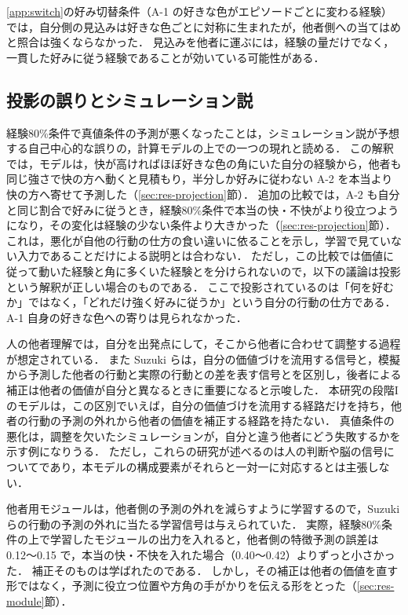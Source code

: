\ref{app:switch}の好み切替条件（A-1 の好きな色がエピソードごとに変わる経験）では，自分側の見込みは好きな色ごとに対称に生まれたが，他者側への当てはめと照合は強くならなかった．
見込みを他者に運ぶには，経験の量だけでなく，一貫した好みに従う経験であることが効いている可能性がある．

\subsection{投影の誤りとシミュレーション説}\label{sec:disc-projection}
経験80\%条件で真値条件の予測が悪くなったことは，シミュレーション説が予想する自己中心的な誤り\cite{goldman2006simulating}の，計算モデルの上での一つの現れと読める．
この解釈では，モデルは，快が高ければほぼ好きな色の角にいた自分の経験から，他者も同じ強さで快の方へ動くと見積もり，半分しか好みに従わない A-2 を本当より快の方へ寄せて予測した（\ref{sec:res-projection}節）．
追加の比較では，A-2 も自分と同じ割合で好みに従うとき，経験80\%条件で本当の快・不快がより役立つようになり，その変化は経験の少ない条件より大きかった（\ref{sec:res-projection}節）．
これは，悪化が自他の行動の仕方の食い違いに依ることを示し，学習で見ていない入力であることだけによる説明とは合わない．
ただし，この比較では価値に従って動いた経験と角に多くいた経験とを分けられないので，以下の議論は投影という解釈が正しい場合のものである．
ここで投影されているのは「何を好むか」ではなく，「どれだけ強く好みに従うか」という自分の行動の仕方である．
A-1 自身の好きな色への寄りは見られなかった．

人の他者理解では，自分を出発点にして，そこから他者に合わせて調整する過程が想定されている\cite{epley2004perspective,tamir2010neural}．
また Suzuki ら\cite{suzuki2012learning}は，自分の価値づけを流用する信号と，模擬から予測した他者の行動と実際の行動との差を表す信号とを区別し，後者による補正は他者の価値が自分と異なるときに重要になると示唆した．
本研究の段階Iのモデルは，この区別でいえば，自分の価値づけを流用する経路だけを持ち，他者の行動の予測の外れから他者の価値を補正する経路を持たない．
真値条件の悪化は，調整を欠いたシミュレーションが，自分と違う他者にどう失敗するかを示す例になりうる．
ただし，これらの研究が述べるのは人の判断や脳の信号についてであり，本モデルの構成要素がそれらと一対一に対応するとは主張しない．

他者用モジュールは，他者側の予測の外れを減らすように学習するので，Suzuki らの行動の予測の外れに当たる学習信号は与えられていた．
実際，経験80\%条件の上で学習したモジュールの出力を入れると，他者側の特徴予測の誤差は 0.12〜0.15 で，本当の快・不快を入れた場合（0.40〜0.42）よりずっと小さかった．
補正そのものは学ばれたのである．
しかし，その補正は他者の価値を直す形ではなく，予測に役立つ位置や方角の手がかりを伝える形をとった（\ref{sec:res-module}節）．

